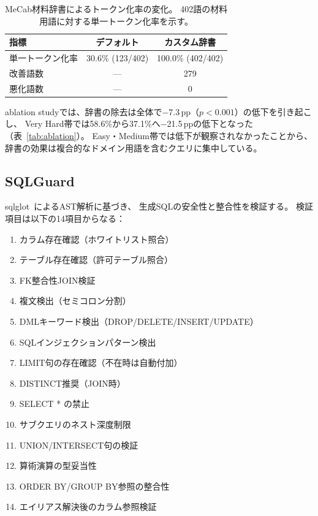 \documentclass[5p,twocolumn]{elsarticle}
\begin{document}
\begin{table}[t]
\centering
\caption{MeCab材料辞書によるトークン化率の変化。
402語の材料用語に対する単一トークン化率を示す。}
\label{tab:mecab}
\small
\begin{tabular}{@{}lcc@{}}
\toprule
指標 & デフォルト & カスタム辞書 \\
\midrule
単一トークン化率 & 30.6\% (123/402) & 100.0\% (402/402) \\
改善語数 & --- & 279 \\
悪化語数 & --- & 0 \\
\bottomrule
\end{tabular}
\end{table}

ablation studyでは、辞書の除去は全体で$-$7.3\,pp（$p<0.001$）の低下を引き起こし、
Very Hard帯では58.6\%から37.1\%へ$-$21.5\,ppの低下となった
（表~\ref{tab:ablation}）。
Easy・Medium帯では低下が観察されなかったことから、
辞書の効果は複合的なドメイン用語を含むクエリに集中している。

\subsection{SQLGuard}
\label{sec:sqlguard}

sqlglot~\cite{sqlglot2023}によるAST解析に基づき、
生成SQLの安全性と整合性を検証する。
検証項目は以下の14項目からなる：

\begin{enumerate}[nosep]
  \item カラム存在確認（ホワイトリスト照合）
  \item テーブル存在確認（許可テーブル照合）
  \item FK整合性JOIN検証
  \item 複文検出（セミコロン分割）
  \item DMLキーワード検出（DROP/DELETE/INSERT/UPDATE）
  \item SQLインジェクションパターン検出
  \item LIMIT句の存在確認（不在時は自動付加）
  \item DISTINCT推奨（JOIN時）
  \item SELECT * の禁止
  \item サブクエリのネスト深度制限
  \item UNION/INTERSECT句の検証
  \item 算術演算の型妥当性
  \item ORDER BY/GROUP BY参照の整合性
  \item エイリアス解決後のカラム参照検証
\end{enumerate}
\end{document}
